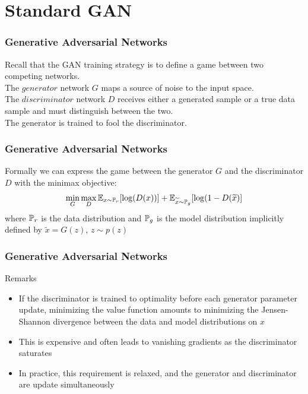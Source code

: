 \documentclass{beamer}
\begin{document}
\section{Standard GAN}
\begin{frame}
\tableofcontents[currentsection]
\end{frame}

\begin{frame}
\frametitle{Generative Adversarial Networks}

Recall that the GAN training strategy is to define a game between two competing networks.\\
\vspace{15pt}
\pause
The $generator$ network $G$ maps a source of noise to the input space. \\
\vspace{15pt}
\pause
The $discriminator$ network $D$ receives either a generated sample or a true data sample and must distinguish between the two.\\
\vspace{15pt}
\pause
The generator is trained to fool the discriminator.\\
\vspace{15pt}
\end{frame}


\begin{frame}
\frametitle{Generative Adversarial Networks}
\vspace{-0.6in}
Formally we can express the game between the generator $G$ and the discriminator $D$ with the minimax objective:
\vspace{0.2in}
$$ \min_{G} \max_{D} \E_{x \sim \P_{r}} [\log(D(x))] + \E_{\tilde{x} \sim \P_{g}} [\log(1 - D(\tilde{x})] $$
where $\P_{r}$ is the data distribution and $\P_{g}$ is the model distribution implicitly defined by $\tilde{x} = G(z)$, $z \sim p(z)$

\end{frame}


\begin{frame}
\frametitle{Generative Adversarial Networks}

\begin{block}{Remarks}
\begin{itemize}
\pause
\item{If the discriminator is trained to optimality before each generator parameter update, minimizing the value function amounts to minimizing the Jensen-Shannon divergence between the data and model distributions on $x$}
\pause
\item{This is expensive and often leads to vanishing gradients as the discriminator saturates}
\pause
\item{In practice, this requirement is relaxed, and the generator and discriminator are update simultaneously}
\end{itemize}
\end{block}


\end{frame}
\end{document}
